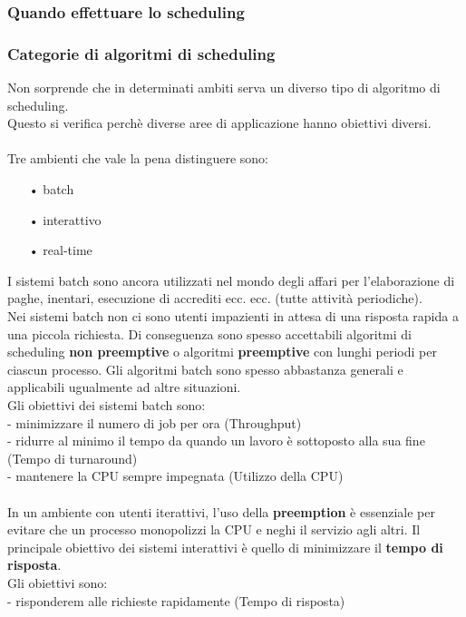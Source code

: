 \documentclass{article}
\begin{document}
\subsubsection{Quando effettuare lo scheduling}

\subsubsection{Categorie di algoritmi di scheduling}
Non sorprende che in determinati ambiti serva un diverso tipo di algoritmo di scheduling.
\\
Questo si verifica perchè diverse aree di applicazione hanno obiettivi diversi.
\\
\\
Tre ambienti che vale la pena distinguere sono:
\begin{enumerate}
   \item[•] batch
   \item[•] interattivo  
   \item[•] real-time
\end{enumerate}
I sistemi batch sono ancora utilizzati nel mondo degli affari per l'elaborazione di paghe, inentari, esecuzione di accrediti ecc. ecc. (tutte attività periodiche).
\\Nei sistemi batch non ci sono utenti impazienti in attesa di una risposta rapida a una piccola richiesta. Di conseguenza sono spesso accettabili algoritmi di scheduling \textbf{non preemptive} o 
algoritmi \textbf{preemptive} con lunghi periodi per ciascun processo. Gli algoritmi batch sono spesso abbastanza generali e applicabili ugualmente ad altre situazioni.
\\Gli obiettivi dei sistemi batch sono:
\\- minimizzare il numero di job per ora (Throughput)
\\- ridurre al minimo il tempo da quando un lavoro è sottoposto alla sua fine (Tempo di turnaround)
\\- mantenere la CPU sempre impegnata (Utilizzo della CPU)
\\
\\
In un ambiente con utenti iterattivi, l'uso della \textbf{preemption} è essenziale per evitare che un processo monopolizzi la CPU e neghi il servizio agli altri. Il principale obiettivo dei sistemi interattivi è quello di minimizzare il \textbf{tempo di risposta}.
\\Gli obiettivi sono:
\\- risponderem alle richieste rapidamente (Tempo di risposta)
\end{document}
